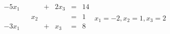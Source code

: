{$\begin{array}{ccccccc}
-5x_1&&&+&2x_3&=&14\\
&&x_2&&&=&1\\
-3x_1&&&+&x_3&=&8\\
\end{array}$}
{$x_1=-2,x_2=1,x_3=2$}